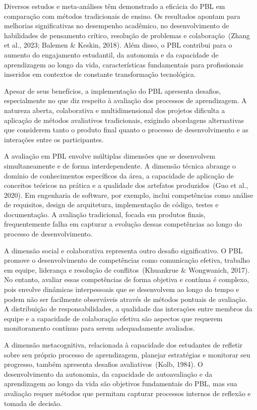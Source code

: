 \documentclass[english, spanish, brazilian]{modelo_dt}
\begin{document}
Diversos estudos e meta-análises têm demonstrado a eficácia do PBL em
comparação com métodos tradicionais de ensino. Os resultados apontam para
melhorias significativas no desempenho acadêmico, no desenvolvimento de
habilidades de pensamento crítico, resolução de problemas e colaboração~(Zhang
et al., 2023; Balemen \& Keskin, 2018). Além disso, o PBL contribui para o
aumento do engajamento estudantil, da autonomia e da capacidade de aprendizagem
ao longo da vida, características fundamentais para profissionais inseridos em
contextos de constante transformação tecnológica.

Apesar de seus benefícios, a implementação do PBL apresenta desafios,
especialmente no que diz respeito à avaliação dos processos de aprendizagem. A
natureza aberta, colaborativa e multidimensional dos projetos dificulta a
aplicação de métodos avaliativos tradicionais, exigindo abordagens alternativas
que considerem tanto o produto final quanto o processo de desenvolvimento e as
interações entre os participantes.

A avaliação em PBL envolve múltiplas dimensões que se desenvolvem
simultaneamente e de forma interdependente. A dimensão técnica abrange o
domínio de conhecimentos específicos da área, a capacidade de aplicação de
conceitos teóricos na prática e a qualidade dos artefatos produzidos~(Guo et
al., 2020). Em engenharia de software, por exemplo, inclui competências como
análise de requisitos, design de arquitetura, implementação de código, testes e
documentação. A avaliação tradicional, focada em produtos finais,
frequentemente falha em capturar a evolução dessas competências ao longo do
processo de desenvolvimento.

A dimensão social e colaborativa representa outro desafio significativo. O PBL
promove o desenvolvimento de competências como comunicação efetiva, trabalho em
equipe, liderança e resolução de conflitos~(Khuankrue \& Wongwanich, 2017). No
entanto, avaliar essas competências de forma objetiva e contínua é complexo,
pois envolve dinâmicas interpessoais que se desenvolvem ao longo do tempo e
podem não ser facilmente observáveis através de métodos pontuais de avaliação.
A distribuição de responsabilidades, a qualidade das interações entre membros
da equipe e a capacidade de colaboração efetiva são aspectos que requerem
monitoramento contínuo para serem adequadamente avaliados.

A dimensão metacognitiva, relacionada à capacidade dos estudantes de refletir
sobre seu próprio processo de aprendizagem, planejar estratégias e monitorar
seu progresso, também apresenta desafios avaliativos~(Kolb, 1984). O
desenvolvimento da autonomia, da capacidade de autoavaliação e da aprendizagem
ao longo da vida são objetivos fundamentais do PBL, mas sua avaliação requer
métodos que permitam capturar processos internos de reflexão e tomada de
decisão.
\end{document}
